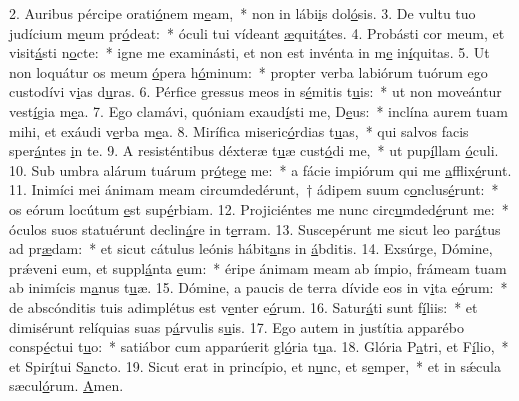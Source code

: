 2. Auribus pércipe orati\uline{ó}nem m\uline{e}am,~* non in lábi\uline{i}s dol\uline{ó}sis.
3. De vultu tuo judícium m\uline{e}um pr\uline{ó}deat:~* óculi tui vídeant \uline{æ}quit\uline{á}tes.
4. Probásti cor meum, et visit\uline{á}sti n\uline{o}cte:~* igne me examinásti, et non est invénta in m\uline{e} in\uline{í}quitas.
5. Ut non loquátur os meum \uline{ó}pera h\uline{ó}minum:~* propter verba labiórum tuórum ego custodívi v\uline{i}as d\uline{u}ras.
6. Pérfice gressus meos in s\uline{é}mitis t\uline{u}is:~* ut non moveántur vest\uline{í}gia m\uline{e}a.
7. Ego clamávi, quóniam exaud\uline{í}sti me, D\uline{e}us:~* inclína aurem tuam mihi, et exáudi v\uline{e}rba m\uline{e}a.
8. Mirífica miseric\uline{ó}rdias t\uline{u}as,~* qui salvos facis sper\uline{á}ntes \uline{i}n te.
9. A resisténtibus déxteræ t\uline{u}æ cust\uline{ó}di me,~* ut pup\uline{í}llam \uline{ó}culi.
10. Sub umbra alárum tuárum pr\uline{ó}teg\uline{e} me:~* a fácie impiórum qui me \uline{a}fflix\uline{é}runt.
11. Inimíci mei ánimam meam circumdedérunt,~† ádipem suum c\uline{o}nclus\uline{é}runt:~* os eórum locútum \uline{e}st sup\uline{é}rbiam.
12. Projiciéntes me nunc circ\uline{u}mded\uline{é}runt me:~* óculos suos statuérunt declin\uline{á}re in t\uline{e}rram.
13. Suscepérunt me sicut leo par\uline{á}tus ad pr\uline{æ}dam:~* et sicut cátulus leónis hábit\uline{a}ns in \uline{á}bditis.
14. Exsúrge, Dómine, prǽveni eum, et suppl\uline{á}nta \uline{e}um:~* éripe ánimam meam ab ímpio, frámeam tuam ab inimícis m\uline{a}nus t\uline{u}æ.
15. Dómine, a paucis de terra dívide eos in v\uline{i}ta e\uline{ó}rum:~* de abscónditis tuis adimplétus est v\uline{e}nter e\uline{ó}rum.
16. Satur\uline{á}ti sunt f\uline{í}liis:~* et dimisérunt relíquias suas p\uline{á}rvulis s\uline{u}is.
17. Ego autem in justítia apparébo consp\uline{é}ctui t\uline{u}o:~* satiábor cum apparúerit gl\uline{ó}ria t\uline{u}a.
18. Glória P\uline{a}tri, et F\uline{í}lio,~* et Spir\uline{í}tui S\uline{a}ncto.
19. Sicut erat in princípio, et n\uline{u}nc, et s\uline{e}mper,~* et in sǽcula sæcul\uline{ó}rum. \uline{A}men.
